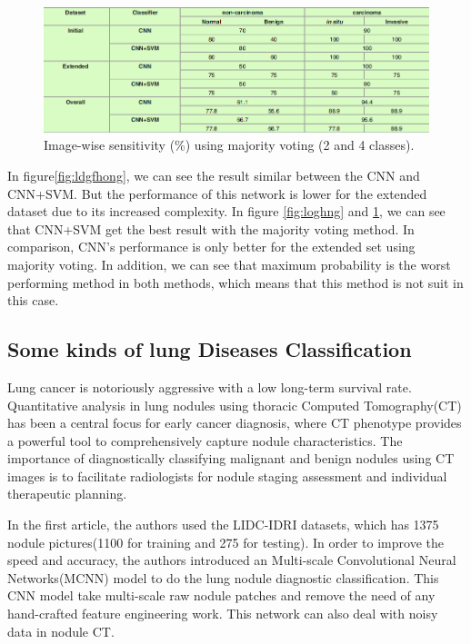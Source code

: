 \documentclass[10pt,twocolumn,letterpaper]{article}
\begin{document}
\begin{figure}[t]
	\begin{center}
		\includegraphics[width=0.8\linewidth]{Pic/14.png}
	\end{center}
	\caption{Image-wise sensitivity (\%) using majority voting (2 and 4 classes).}
	\label{fig:lomhng}

\end{figure}

In figure\ref{fig:ldgfhong}, we can see the result similar between the CNN and CNN+SVM. But the performance of this network is lower for the extended dataset due to its increased complexity. In figure \ref{fig:loghng} and \ref{fig:lomhng}, we can see that CNN+SVM get the best result with the majority voting method. In comparison, CNN's performance is only better for the extended set using majority voting. In addition, we can see that maximum probability is the worst performing method in both methods, which means that this method is not suit in this case.

\subsection{Some kinds of lung Diseases Classification}

Lung cancer is notoriously aggressive with a low long-term survival rate. Quantitative analysis in lung nodules using thoracic Computed Tomography(CT) has been a central focus for early cancer diagnosis, where CT phenotype provides a powerful tool to comprehensively capture nodule characteristics. The importance of diagnostically classifying malignant and benign nodules using CT images is to facilitate radiologists for nodule staging assessment and individual therapeutic planning.\cite{shen2015multi}

In the first article\cite{shen2015multi}, the authors used the LIDC-IDRI datasets, which has 1375 nodule pictures(1100 for training and 275 for testing). In order to improve the speed and accuracy, the authors introduced an Multi-scale Convolutional Neural Networks(MCNN) model to do the lung nodule diagnostic classification. This CNN model take multi-scale raw nodule patches and remove the need of any hand-crafted feature engineering work. This network can also deal with noisy data in nodule CT.
\end{document}
